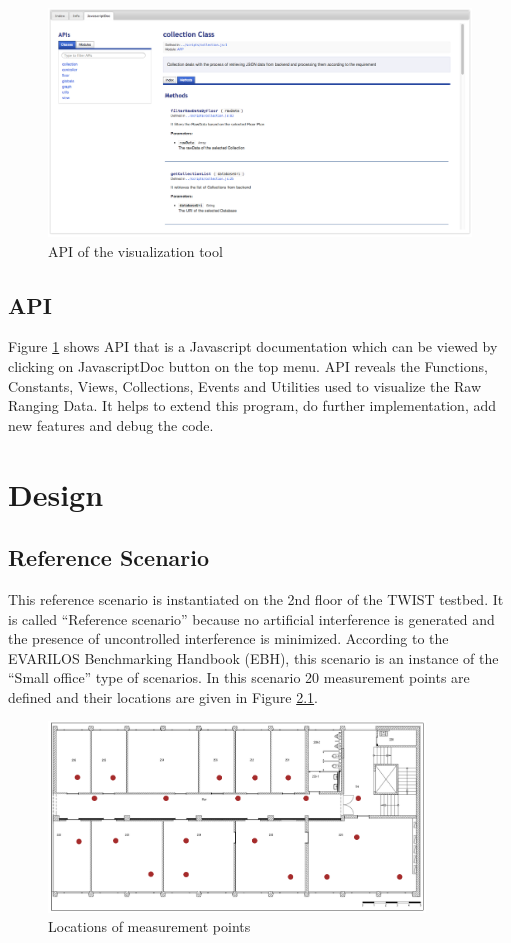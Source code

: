 \documentclass[11pt,a4paper,headinclude,footinclude,chapterprefix=on]{scrreprt}
\begin{document}
\begin{figure}
	[!h] \centering 
	\includegraphics[width=15cm]{Images/tool_jsDoc.png} \caption{API of the visualization tool} \label{fig:tool:jsDoc} 
\end{figure}

\section{API} 
Figure \ref{fig:tool:jsDoc} shows API that is a Javascript documentation which can be viewed by clicking on JavascriptDoc button on the top menu. API reveals the Functions, Constants, Views, Collections, Events and Utilities used to visualize the Raw Ranging Data. It helps to extend this program, do further implementation, add new features and debug the code. 

\chapter{Design} 
\section{Reference Scenario} 
This reference scenario is instantiated on the 2nd floor of the TWIST testbed. It is called “Reference scenario” because no artificial interference is generated and the presence of uncontrolled interference is minimized. According to the EVARILOS Benchmarking Handbook (EBH), this scenario is an instance of the “Small office” type of scenarios. In this scenario 20 measurement points are defined and their locations are given in Figure \ref{fig:floor}.

\begin{figure}
	[!h] \centering 
	\includegraphics[width=100mm]{Images/floor} \caption{Locations of measurement points} \label{fig:floor} 
\end{figure}
\end{document}
